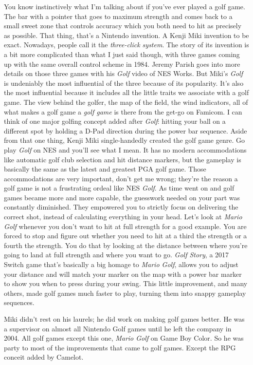 \documentclass{book}
\begin{document}
You know instinctively what I’m talking about if you’ve ever played a golf game. The bar with a pointer that goes to maximum strength and comes back to a small sweet zone that controls accuracy which you both need to hit as precisely as possible. That thing, that’s a Nintendo invention. A Kenji Miki invention to be exact. Nowadays, people call it the \emph{three-click system}. The story of its invention is a bit more complicated than what I just said though, with three games coming up with the same overall control scheme in 1984. Jeremy Parish goes into more details on those three games with his \emph{Golf} video of NES Works. But Miki’s \emph{Golf} is undeniably the most influential of the three because of its popularity. It’s also the most influential because it includes all the little traits we associate with a golf game. The view behind the golfer, the map of the field, the wind indicators, all of what makes a golf game a \emph{golf game} is there from the get-go on Famicom. I can think of one major golfing concept added after \emph{Golf}: hitting your ball on a different spot by holding a D-Pad direction during the power bar sequence. Aside from that one thing, Kenji Miki single-handedly created the golf game genre. Go play \emph{Golf} on NES and you’ll see what I mean. It has no modern accommodations like automatic golf club selection and hit distance markers, but the gameplay is basically the same as the latest and greatest PGA golf game. Those accommodations are very important, don’t get me wrong; they’re the reason a golf game is not a frustrating ordeal like NES \emph{Golf}. As time went on and golf games became more and more capable, the guesswork needed on your part was constantly diminished. They empowered you to strictly focus on delivering the correct shot, instead of calculating everything in your head. Let’s look at \emph{Mario Golf} whenever you don’t want to hit at full strength for a good example. You are forced to stop and figure out whether you need to hit at a third the strength or a fourth the strength. You do that by looking at the distance between where you’re going to land at full strength and where you want to go. \emph{Golf Story}, a 2017 Switch game that’s basically a big homage to \emph{Mario Golf}, allows you to adjust your distance and will match your marker on the map with a power bar marker to show you when to press during your swing. This little improvement, and many others, made golf games much faster to play, turning them into snappy gameplay sequences.

Miki didn’t rest on his laurels; he did work on making golf games better. He was a supervisor on almost all Nintendo Golf games until he left the company in 2004. All golf games except this one, \emph{Mario Golf} on Game Boy Color. So he was party to most of the improvements that came to golf games. Except the RPG conceit added by Camelot.
\end{document}
